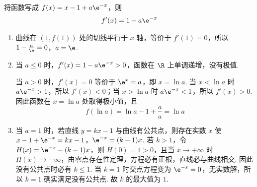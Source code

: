 \begin{solution}
将函数写成 \(f(x)=x-1+a\e^{-x}\)，则
\[
f'(x)=1-a\e^{-x}
\]
\begin{enumerate}
\item 曲线在 \((1,f(1))\) 处的切线平行于 \(x\) 轴，等价于 \(f'(1)=0\)，所以
\(1-\frac a\e=0\)，\(a=\e\).

\item 当 \(a\leqslant0\) 时，\(f'(x)=1-a\e^{-x}>0\)，函数在 \(\R\) 上单调递增，没有极值.

当 \(a>0\) 时，\(f'(x)=0\) 等价于 \(\e^x=a\)，即 \(x=\ln a\). 当 \(x<\ln a\) 时 \(a\e^{-x}>1\)，所以 \(f'(x)<0\)；当 \(x>\ln a\) 时 \(a\e^{-x}<1\)，所以 \(f'(x)>0\). 因此函数在 \(x=\ln a\) 处取得极小值，且
\[
f(\ln a)=\ln a-1+\frac{a}{a}=\ln a
\]

\item 当 \(a=1\) 时，若直线 \(y=kx-1\) 与曲线有公共点，则存在实数 \(x\) 使
\(x-1+\e^{-x}=kx-1\)，\(\e^{-x}=(k-1)x\).
若 \(k>1\)，令 \(H(x)=\e^{-x}-(k-1)x\)，则 \(H(0)=1>0\)，且当 \(x\to+\infty\) 时 \(H(x)\to-\infty\)，由零点存在性定理，方程必有正根，直线必与曲线相交. 因此没有公共点时必有 \(k\leqslant1\). 当 \(k=1\) 时交点方程变为 \(\e^{-x}=0\)，无实数解，所以 \(k=1\) 确实满足没有公共点. 故 \(k\) 的最大值为 \(1\).
\end{enumerate}
\end{solution}
